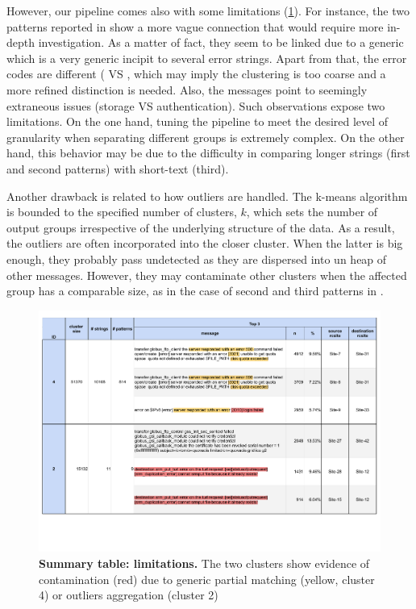However, our pipeline comes also with some limitations (\cref{fig:cluster_summary:failures}). 
For instance, the two patterns reported in  show a more vague connection that would require more in-depth investigation.
As a matter of fact, they seem to be linked due to a generic  which is a very generic incipit to several error strings. Apart from that, the error codes are different (\textbox{[3021]} VS \textbox{[3010]}, which may imply the clustering is too coarse and a more refined distinction is needed.
Also, the messages point to seemingly extraneous issues (storage VS authentication).
Such observations expose two limitations. On the one hand, tuning the pipeline to meet the desired level of granularity when separating different groups is extremely complex. 
On the other hand, this behavior may be due to the difficulty in comparing longer strings (first and second patterns) with short-text (third).

Another drawback is related to how outliers are handled. The k-means algorithm is bounded to the specified number of clusters, $k$, which sets the number of output groups irrespective of the underlying structure of the data.
As a result, the outliers are often incorporated into the closer cluster. When the latter is big enough, they probably pass undetected as they are dispersed into un heap of other messages. However, they may contaminate other clusters when the affected group has a comparable size, as in the case of second and third patterns in .

\begin{landscape}
\begin{figure}
    \centering
    \includegraphics[width=\linewidth]{figures/510_results/cluster-summary-failures_annotated_printed.pdf}
    \caption{\textbf{Summary table: limitations.}
    The two clusters show evidence of contamination (red) due to generic partial matching (yellow, cluster 4) or outliers aggregation (cluster 2)
    }
    \label{fig:cluster_summary:failures}
\end{figure}
\end{landscape}

